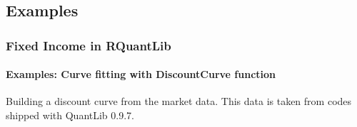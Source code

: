 \documentclass[compress]{beamer}
\begin{document}
\subsection{Examples}
\begin{frame}[shrink]
	\frametitle{Fixed Income in RQuantLib}
	\framesubtitle{Examples: Curve fitting with DiscountCurve function}
Building a discount curve from the market data. This data is taken from codes shipped with QuantLib 0.9.7. 
\vskip15pt
\pagecolor{bgcolor}
\noindent
\scriptsize
\ttfamily
{}\hlsym{$<${-}\ }\hlstd{}\hlstd{}\hlsym{(}\hlsym{=}\hlstd{}\hlstd{}\hlsym{(}\hlstd{}\hlstd{}\hlsym{),}\hspace*{\fill}\\
\hlstd{}\hlstd{\ \ \ \ \ \ \ \ \ \ \ \ \ \ \ }\hlsym{=}\hlstd{}\hlstd{}\hlsym{(}\hlstd{}\hlstd{}\hlsym{),}\hspace*{\fill}\\
\hlstd{}\hlstd{\ \ \ \ \ \ \ \ \ \ \ \ \ \ \ }\hlsym{=}\hlstd{}\hlstd{}\hlsym{,}\hspace*{\fill}\\
\hlstd{}\hlstd{\ \ \ \ \ \ \ \ \ \ \ \ \ \ \ }\hlsym{=}\hlstd{}\hlstd{}\hlsym{)}\hspace*{\fill}\\
\hlsym{$<${-}\ }\hlstd{}\hlstd{}\hlsym{(}\hlsym{=}\hlstd{}\hlstd{}\hlsym{,\ }\hlsym{=}\hlstd{}\hlstd{}\hlsym{,}\hspace*{\fill}\\
\hlstd{}\hlstd{\ \ \ \ \ \ \ \ \ \ \ \ \ \ \ \ \ }\hlsym{=}\hlstd{}\hlstd{}\hlsym{,\ }\hlsym{=}\hlstd{}\hlstd{}\hlsym{,}\hspace*{\fill}\\
\hlstd{}\hlstd{\ \ \ \ \ \ \ \ \ \ \ \ \ \ \ \ \ }\hlsym{=}\hlstd{}\hlstd{}\hlsym{,\ }\hlsym{=}\hlstd{}\hlstd{}\hlsym{,}\hspace*{\fill}\\
\hlstd{}\hlstd{\ \ \ \ \ \ \ \ \ \ \ \ \ \ \ \ \ }\hlsym{=}\hlstd{}\hlstd{}\hlsym{,\ }\hlsym{=}\hlstd{}\hlstd{}\hlsym{,}\hspace*{\fill}\\
\hlstd{}\hlstd{\ \ \ \ \ \ \ \ \ \ \ \ \ \ \ \ \ }\hlsym{=}\hlstd{}\hlstd{}\hlsym{,\ }\hlsym{=}\hlstd{}\hlstd{}\hlsym{,}\hspace*{\fill}\\

\end{frame}
\end{document}
